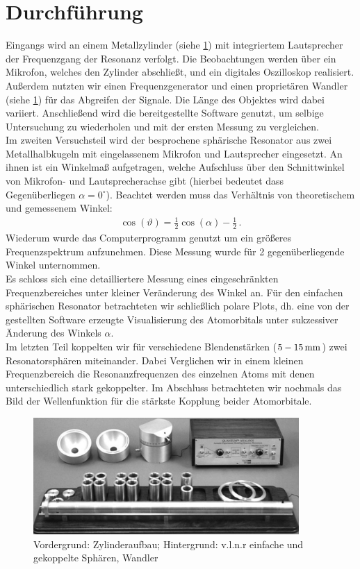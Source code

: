\documentclass[numbers=noenddot,12pt,a4paper]{scrartcl}
\begin{document}
\section{Durchführung}
Eingangs wird an einem Metallzylinder (siehe \ref{img:quantum}) mit integriertem Lautsprecher der Frequenzgang der Resonanz verfolgt. Die Beobachtungen werden über ein Mikrofon, welches den Zylinder abschließt, und ein digitales Oszilloskop realisiert. Außerdem nutzten wir einen Frequenzgenerator und einen proprietären Wandler (siehe \ref{img:quantum}) für das Abgreifen der Signale. Die Länge des Objektes wird dabei variiert. Anschließend wird die bereitgestellte Software genutzt, um selbige Untersuchung zu wiederholen und mit der ersten Messung zu vergleichen.\\
Im zweiten Versuchsteil wird der besprochene sphärische Resonator aus zwei Metallhalbkugeln mit eingelassenem Mikrofon und Lautsprecher eingesetzt. An ihnen ist ein Winkelmaß aufgetragen, welche Aufschluss über den Schnittwinkel von Mikrofon- und Lautsprecherachse gibt (hierbei bedeutet dass Gegenüberliegen $\alpha=0^\circ$). Beachtet werden muss das Verhältnis von theoretischem und gemessenem Winkel:
\begin{align*}
	\cos\left(\vartheta\right)=\frac{1}{2}\cos\left(\alpha\right)-\frac{1}{2} \, .
\end{align*}
Wiederum wurde das Computerprogramm genutzt um ein größeres Frequenzspektrum aufzunehmen. Diese Messung wurde für 2 gegenüberliegende Winkel unternommen.\\
Es schloss sich eine detailliertere Messung eines eingeschränkten Frequenzbereiches unter kleiner Veränderung des Winkel an. Für den einfachen sphärischen Resonator betrachteten wir schließlich polare Plots, dh. eine von der gestellten Software erzeugte Visualisierung des Atomorbitals unter sukzessiver Änderung des Winkels $\alpha$.\\
Im letzten Teil koppelten wir für verschiedene Blendenstärken ($\unit[5-15]{mm}$) zwei Resonatorsphären miteinander. Dabei Verglichen wir in einem kleinen Frequenzbereich die Resonanzfrequenzen des einzelnen Atoms mit denen unterschiedlich stark gekoppelter. Im Abschluss betrachteten wir nochmals das Bild der Wellenfunktion für die stärkste Kopplung beider Atomorbitale.


\begin{figure}[H]
	\includegraphics[width=0.9\textwidth]{quatumsw1.png}
	\centering
	\caption{Vordergrund: Zylinderaufbau; Hintergrund: v.l.n.r einfache und gekoppelte Sphären, Wandler} \label{img:quantum}
\end{figure}
\end{document}
